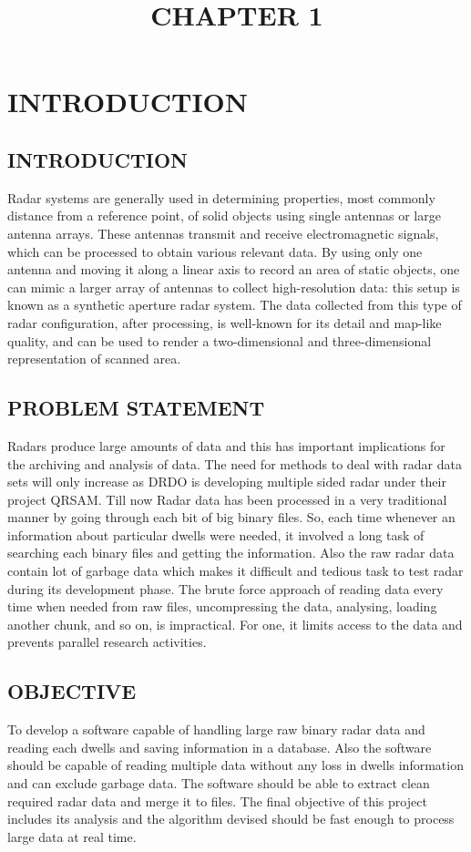 \documentclass[14pt]{article} %
\begin{document}
\tableofcontents
\pagebreak
\listoffigures
\pagebreak
\title{CHAPTER 1}
\maketitle
\section{INTRODUCTION}

\subsection{INTRODUCTION}
         Radar systems are generally used in determining properties, most commonly distance from a reference point, of solid objects using single antennas or large antenna arrays. These antennas transmit and receive electromagnetic signals, which can be processed to obtain various relevant data. By using only one antenna and moving it along a linear axis to record an area of static objects, one can mimic a larger array of antennas to collect high-resolution data: this setup is known as a synthetic aperture radar system. The data collected from this type of radar configuration, after processing, is well-known for its detail and map-like quality, and can be used to render a two-dimensional and three-dimensional representation of scanned area.

\subsection{PROBLEM STATEMENT}
           Radars produce large amounts of data and this has important implications for the archiving and analysis of data. The need for methods to deal with radar data sets will only increase as DRDO is developing multiple sided radar under their project QRSAM. Till now Radar data has been processed in a very traditional manner by going through each bit of big binary files. So, each time whenever an information about particular dwells were needed, it involved a long task of searching each binary files and getting the information. Also the raw radar data contain lot of garbage data which makes it difficult and tedious task to test radar during its development phase. The brute force approach of reading data every time when needed from raw files, uncompressing the data, analysing, loading another chunk, and so on, is impractical. For one, it limits access to the data and prevents parallel research activities.

\subsection{OBJECTIVE}
 To develop a software capable of handling large raw binary radar data and reading each dwells and saving information in a database. Also the software should be capable of reading multiple data without any loss in dwells information and can exclude garbage data. The software should be able to extract clean required radar data and merge it to files. The final objective of this project includes its analysis and the algorithm devised should be fast enough to process large data at real time. 
\end{document}
